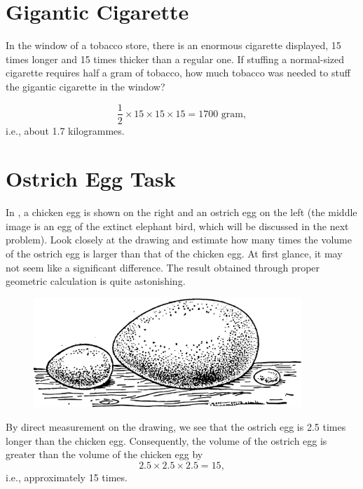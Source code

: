 \section{Gigantic Cigarette}
\label{sec-11.5}


\ques In the window of a tobacco store, there is an enormous cigarette displayed, 15 times longer and 15 times thicker than a regular one. If stuffing a normal-sized cigarette requires half a gram of tobacco, how much tobacco was needed to stuff the gigantic cigarette in the window?

\ans \begin{equation*}%
\frac{1}{2} \times 15 \times 15 \times 15 = 1700 \,\, \text{gram}, 
\end{equation*}
i.e., about 1.7 kilogrammes.

\section{Ostrich Egg Task}
\label{sec-11.6}

\ques In , a chicken egg is shown on the right and an ostrich egg on the left (the middle image is an egg of the extinct elephant bird, which will be discussed in the next problem). Look closely at the drawing and estimate how many times the volume of the ostrich egg is larger than that of the chicken egg. At first glance, it may not seem like a significant difference. The result obtained through proper geometric calculation is quite astonishing.


\begin{figure}[h!]
\centering
\includegraphics[width=0.9\textwidth]{figures/ch-11/fig-167.pdf}
\end{figure}

\ans By direct measurement on the drawing, we see that the ostrich egg is 2.5 times longer than the chicken egg. Consequently, the volume of the ostrich egg is greater than the volume of the chicken egg by
\begin{equation*}%
2.5 \times 2.5 \times 2.5 = 15, 
\end{equation*}
i.e., approximately 15 times.

